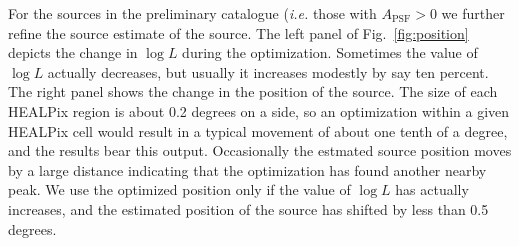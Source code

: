 \documentclass[useAMS,usenatbib]{mn2e}
\begin{document}
For the sources in the preliminary catalogue ({\em i.e.} those with
$A_\mathrm{PSF}>0$ we further refine the source estimate of the
source.  The left panel of Fig.~\ref{fig:position} depicts the change
in $\log L$ during the optimization.  Sometimes the value of $\log L$
actually decreases, but usually it increases modestly by say ten
percent.  The right panel shows the change in the position of the
source.  The size of each HEALPix region is about 0.2 degrees on a
side, so an optimization within a given HEALPix cell would result in a
typical movement of about one tenth of a degree, and the results bear
this output.  Occasionally the estmated source position moves by a
large distance indicating that the optimization has found another
nearby peak.  We use the optimized position only if the value of $\log
L$ has actually increases, and the estimated position of the source
has shifted by less than 0.5 degrees.
\end{document}
